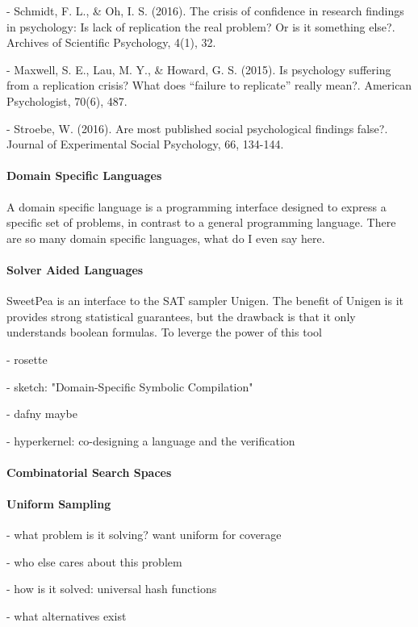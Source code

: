 - Schmidt, F. L., \& Oh, I. S. (2016). The crisis of confidence in research findings in psychology: Is lack of replication the real problem? Or is it something else?. Archives of Scientific Psychology, 4(1), 32.

- Maxwell, S. E., Lau, M. Y., \& Howard, G. S. (2015). Is psychology suffering from a replication crisis? What does “failure to replicate” really mean?. American Psychologist, 70(6), 487.

- Stroebe, W. (2016). Are most published social psychological findings false?. Journal of Experimental Social Psychology, 66, 134-144.


\paragraph*{Domain Specific Languages}

A domain specific language is a programming interface designed to express a specific set of problems, in contrast to a general programming language. There are so many domain specific languages, what do I even say here.

\paragraph*{Solver Aided Languages}

SweetPea is an interface to the SAT sampler Unigen. The benefit of Unigen is it provides strong statistical guarantees, but the drawback is that it only understands boolean formulas. To leverge the power of this tool

- rosette \cite{torlak2014lightweight}

- sketch: "Domain-Specific Symbolic Compilation"

- dafny maybe

- hyperkernel: co-designing a language and the verification


\paragraph*{Combinatorial Search Spaces}



\paragraph*{Uniform Sampling}

\cite{meel2016constrained}

- what problem is it solving? want uniform for coverage

- who else cares about this problem

- how is it solved: universal hash functions

- what alternatives exist
